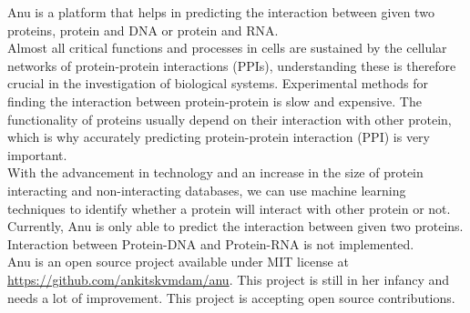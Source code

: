 \documentclass[../main.tex]{subfiles}
\begin{document}
Anu is a platform that helps in predicting the interaction between given
two proteins, protein and DNA or protein and RNA. \\
Almost all critical functions and processes in cells are sustained by the
cellular networks of protein-protein interactions (PPIs), understanding these
is therefore crucial in the investigation of biological systems.
Experimental methods for finding the interaction between protein-protein
is slow and expensive. The functionality of proteins usually depend on their
interaction with other protein, which is why accurately predicting
protein-protein interaction (PPI) is very important. \\
With the advancement in technology and an increase in the size of protein
interacting and non-interacting databases, we can use machine learning
techniques to identify whether a protein will interact with other protein
or not. \\
Currently, Anu is only able to predict the interaction between given
two proteins. Interaction between Protein-DNA and Protein-RNA is not
implemented. \\
Anu is an open source project available under MIT license at \\
\href{https://github.com/ankitskvmdam/anu}{https://github.com/ankitskvmdam/anu}.
This project is still in her infancy and needs a lot of improvement.
This project is accepting open source contributions.
\end{document}
